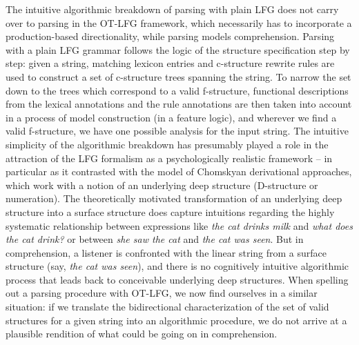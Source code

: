 \documentclass[output=paper,hidelinks]{langscibook}
\begin{document}
The intuitive algorithmic breakdown of parsing with plain LFG does not carry over to parsing in the OT-LFG framework, which necessarily has to incorporate a production-based directionality, while parsing models comprehension.  Parsing with a plain LFG grammar follows the logic of the structure specification step by step: given a string, matching lexicon entries and c-structure rewrite rules are used to construct a set of c-structure trees spanning the string. To narrow the set down to the trees which correspond to a valid f-structure, functional descriptions from the lexical annotations and the rule annotations are then taken into account in a process of model construction (in a feature logic), and wherever we find a valid f-structure, we have one possible analysis for the input string. The intuitive simplicity of the algorithmic breakdown has presumably played a role in the attraction of the LFG formalism as a psychologically realistic framework -- in particular as it contrasted with the model of Chomskyan derivational approaches, which work with a notion of an underlying deep structure (D-structure or numeration). The theoretically motivated transformation of an underlying deep structure into a surface structure does capture intuitions regarding the highly systematic relationship between expressions like \emph{the cat drinks milk} and \emph{what does the cat drink?} or between \emph{she saw the cat} and \emph{the cat was seen}.  But in comprehension, a listener is confronted with the linear string from a surface structure (say, \emph{the cat was seen}), and there is no cognitively intuitive algorithmic process that leads back to conceivable underlying deep structures. When spelling out a parsing procedure with OT-LFG, we now find ourselves in a similar situation: if we translate the bidirectional characterization of the set of valid structures for a given string into an algorithmic procedure, we do not arrive at a plausible rendition of what could be going on in comprehension. %
\end{document}
